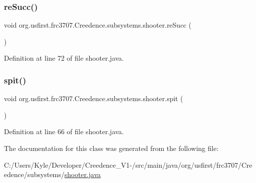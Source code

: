 \mbox{\label{classorg_1_1usfirst_1_1frc3707_1_1_creedence_1_1subsystems_1_1shooter_aa4b8b7e6288a9769556079c607407592}} 
\subsubsection{\texorpdfstring{reSucc()}{reSucc()}}
{\footnotesize\ttfamily void org.\+usfirst.\+frc3707.\+Creedence.\+subsystems.\+shooter.\+re\+Succ (\begin{DoxyParamCaption}{ }\end{DoxyParamCaption})}



Definition at line 72 of file shooter.\+java.

\mbox{\label{classorg_1_1usfirst_1_1frc3707_1_1_creedence_1_1subsystems_1_1shooter_aceb2e8874f3af96e152354ed33c96e9a}} 
\subsubsection{\texorpdfstring{spit()}{spit()}}
{\footnotesize\ttfamily void org.\+usfirst.\+frc3707.\+Creedence.\+subsystems.\+shooter.\+spit (\begin{DoxyParamCaption}{ }\end{DoxyParamCaption})}



Definition at line 66 of file shooter.\+java.



The documentation for this class was generated from the following file\+:\begin{DoxyCompactItemize}
\item 
C\+:/\+Users/\+Kyle/\+Developer/\+Creedence\+\_\+\+V1-\//src/main/java/org/usfirst/frc3707/\+Creedence/subsystems/\mbox{\hyperlink{shooter_8java}{shooter.\+java}}\end{DoxyCompactItemize}
